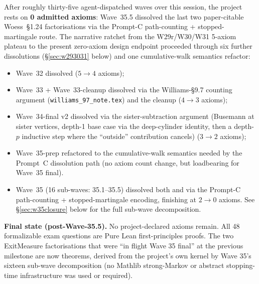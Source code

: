 \documentclass[11pt,a4paper]{article}
\theoremstyle{plain}
\theoremstyle{definition}
\begin{document}
After roughly thirty-five agent-dispatched waves over this session,
the project rests on \textbf{0 admitted axioms}: Wave~35.5
dissolved the last two paper-citable Woess~\S1.24 factorisations
via the Prompt-C path-counting + stopped-martingale route. The
narrative ratchet from the W29r/W30/W31 5-axiom plateau to the
present zero-axiom design endpoint proceeded through six further
dissolutions (\S\ref{sec:w293031} below) and one cumulative-walk
semantics refactor:
\begin{itemize}[leftmargin=1.5em]
\item Wave~32 dissolved 
      ($5 \to 4$ axioms);
\item Wave~33 + Wave~33-cleanup dissolved
       via
      the Williams-§9.7 counting argument
      (\texttt{williams\_97\_note.tex}) and the
       cleanup
      ($4 \to 3$ axioms);
\item Wave~34-final v2 dissolved
       via the
      sister-subtraction argument (Busemann at sister vertices,
      depth-1 base case via the deep-cylinder identity, then a
      depth-$p$ inductive step where the ``outside'' contribution
      cancels)
      ($3 \to 2$ axioms);
\item Wave~35-prep refactored  to the cumulative-walk
      semantics needed by the Prompt~C dissolution path (no axiom
      count change, but loadbearing for Wave~35 final).
\item Wave~35 (16 sub-waves: 35.1--35.5) dissolved both
       and
      via the Prompt-C path-counting + stopped-martingale encoding,
      finishing at $2 \to 0$ axioms. See \S\ref{sec:w35closure}
      below for the full sub-wave decomposition.
\end{itemize}

\textbf{Final state (post-Wave-35.5).} No project-declared axioms
remain. All 48 formalizable exam questions are Pure Lean
first-principles proofs. The two ExitMeasure factorisations that
were ``in flight Wave 35 final'' at the previous milestone are now
theorems, derived from the project's own kernel by Wave 35's
sixteen sub-wave decomposition (no Mathlib strong-Markov or
abstract stopping-time infrastructure was used or required).
\end{document}
